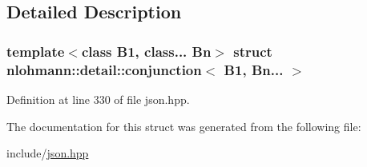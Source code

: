 \subsection{Detailed Description}
\subsubsection*{template$<$class B1, class... Bn$>$\newline
struct nlohmann\+::detail\+::conjunction$<$ B1, Bn... $>$}



Definition at line 330 of file json.\+hpp.



The documentation for this struct was generated from the following file\+:\begin{DoxyCompactItemize}
\item 
include/\hyperlink{json_8hpp}{json.\+hpp}\end{DoxyCompactItemize}
